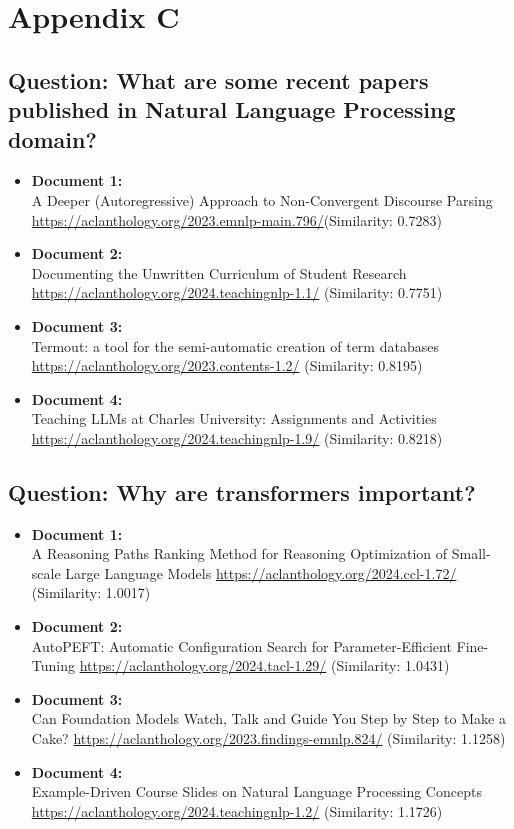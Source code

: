 \documentclass[fleqn,moreauthors,10pt]{ds_report}
\begin{document}
\section*{Appendix C}

\subsection*{Question: What are some recent papers published in Natural Language Processing domain?}

\begin{itemize}
  \item \textbf{Document 1:} \\
  A Deeper (Autoregressive) Approach to Non-Convergent Discourse Parsing \url{https://aclanthology.org/2023.emnlp-main.796/}(Similarity: 0.7283)
  \item \textbf{Document 2:} \\
  Documenting the Unwritten Curriculum of Student Research \url{https://aclanthology.org/2024.teachingnlp-1.1/} (Similarity: 0.7751)
  \item \textbf{Document 3:} \\
  Termout: a tool for the semi-automatic creation of term databases \url{https://aclanthology.org/2023.contents-1.2/} (Similarity: 0.8195)
  \item \textbf{Document 4:} \\
  Teaching LLMs at Charles University: Assignments and Activities \url{https://aclanthology.org/2024.teachingnlp-1.9/} (Similarity: 0.8218)
\end{itemize}

\subsection*{Question: Why are transformers important?}

\begin{itemize}
  \item \textbf{Document 1:} \\
  A Reasoning Paths Ranking Method for Reasoning Optimization of Small-scale Large Language Models \url{https://aclanthology.org/2024.ccl-1.72/} (Similarity: 1.0017)
  \item \textbf{Document 2:} \\
  AutoPEFT: Automatic Configuration Search for Parameter-Efficient Fine-Tuning \url{https://aclanthology.org/2024.tacl-1.29/} (Similarity: 1.0431)
  \item \textbf{Document 3:} \\
  Can Foundation Models Watch, Talk and Guide You Step by Step to Make a Cake? \url{https://aclanthology.org/2023.findings-emnlp.824/} (Similarity: 1.1258)
  \item \textbf{Document 4:} \\
  Example-Driven Course Slides on Natural Language Processing Concepts \url{https://aclanthology.org/2024.teachingnlp-1.2/} (Similarity: 1.1726)
\end{itemize}
\end{document}
